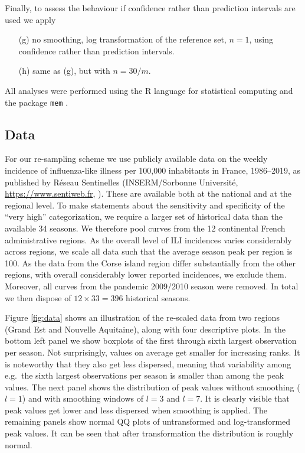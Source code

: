 \documentclass{article}
\begin{document}
Finally, to assess the behaviour if confidence rather than prediction intervals are used we apply
\begin{enumerate}
\item[(g)] no smoothing, log transformation of the reference set, $n = 1$, using confidence rather than prediction intervals.
\item[(h)] same as (g), but with $n = 30/m$.
\end{enumerate}
All analyses were performed using the R language for statistical computing \citep{RCT2020} and the package \texttt{mem} \citep{Lozano2020}.

\subsection{Data}
\label{subsec:data}

For our re-sampling scheme we use publicly available data on the weekly incidence of influenza-like illness per 100,000 inhabitants in France, 1986--2019, as published by Réseau Sentinelles (INSERM/Sorbonne Université, \url{https://www.sentiweb.fr}, \citealt{Flahault2006}). These are available both at the national and at the regional level. To make statements about the sensitivity and specificity of the ``very high'' categorization, we require a larger set of historical data than the available 34 seasons. We therefore pool curves from the 12 continental French administrative regions. As the overall level of ILI incidences varies considerably across regions, we scale all data such that the average season peak per region is 100. As the data from the Corse island region differ substantially from the other regions, with overall considerably lower reported incidences, we exclude them. Moreover, all curves from the pandemic 2009/2010 season were removed. In total we then dispose of $12 \times 33 = 396$ historical seasons.

Figure \ref{fig:data} shows an illustration of the re-scaled data from two regions (Grand Est and Nouvelle Aquitaine), along with four descriptive plots. In the bottom left panel we show boxplots of the first through sixth largest observation per season. Not surprisingly, values on average get smaller for increasing ranks. It is noteworthy that they also get less dispersed, meaning that variability among e.g.\ the sixth largest observations per season is smaller than among the peak values. The next panel shows the distribution of peak values without smoothing ($l = 1$) and with smoothing windows of $l = 3$ and $l = 7$. It is clearly visible that peak values get lower and less dispersed when smoothing is applied. The remaining panels show normal QQ plots of untransformed and log-transformed peak values. It can be seen that after transformation the distribution is roughly normal.
\end{document}
